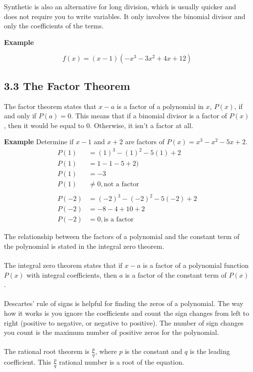 \documentclass[12pt]{article}
\begin{document}
Synthetic is also an alternative for long division, which is usually quicker and does not require you to write variables. It only involves the binomial divisor and only the coefficients of the terms.

\begin{tcolorbox}
	\textbf{Example}
	\begin{center}
	\end{center}
	\begin{equation*}
		f(x)=(x-1)(-x^3-3x^2+4x+12)
	\end{equation*}
\end{tcolorbox}

\subsection*{3.3 The Factor Theorem}

The factor theorem states that $x - a$ is a factor of a polynomial in $x$, $P(x)$, if and only if $P(a) = 0$. This means that if a binomial divisor is a factor of $P(x)$, then it would be equal to 0. Otherwise, it isn't a factor at all.

\begin{tcolorbox}
	\textbf{Example} Determine if $x-1$ and $x+2$ are factors of $P(x)=x^3-x^2-5x+2$.
	\begin{align*}
		P(1)&=(1)^3-(1)^2-5(1)+2 \\
		P(1)&= 1 - 1 - 5 + 2) \\
		P(1)&= -3 \\
		P(1)&\ne 0, \text{not a factor} \\
		\\
		P(-2)&=(-2)^3-(-2)^2-5(-2)+2 \\
		P(-2)&= -8 -4 + 10 + 2 \\
		P(-2)&= 0, \text{is a factor}
	\end{align*}
\end{tcolorbox}

The relationship between the factors of a polynomial and the constant term of the polynomial is stated in the integral zero theorem. \\
\\
The integral zero theorem states that if $x - a$ is a factor of a polynomial function $P(x)$ with integral coefficients, then $a$ is a factor of the constant term of $P(x)$. \\
\\
Descartes' rule of signs is helpful for finding the zeros of a polynomial. The way how it works is you ignore the coefficients and count the sign changes from left to right (positive to negative, or negative to positive). The number of sign changes you count is the maximum number of positive zeros for the polynomial. \\
\\
The rational root theorem is $\frac{p}{q}$, where $p$ is the constant and $q$ is the leading coefficient. This $\frac{p}{q}$ rational number is a root of the equation.
\end{document}
